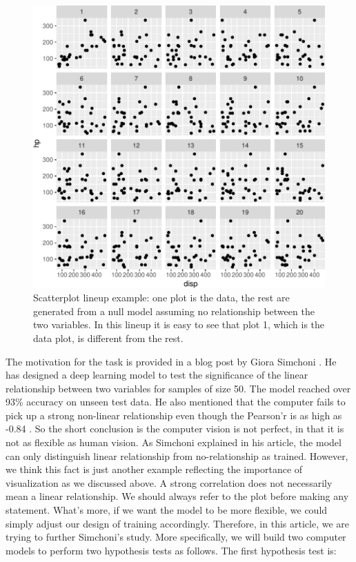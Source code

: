 \documentclass[12pt]{article}
\begin{document}
\begin{figure}
\centering
\includegraphics{pc_plots_files/figure-latex/lineup-1.pdf}
\caption{Scatterplot lineup example: one plot is the data, the rest are
generated from a null model assuming no relationship between the two
variables. In this lineup it is easy to see that plot 1, which is the
data plot, is different from the rest.}
\end{figure}

The motivation for the task is provided in a blog post by Giora Simchoni
\citep{SIM18}. He has designed a deep learning model to test the
significance of the linear relationship between two variables for
samples of size 50. The model reached over 93\% accuracy on unseen test
data. He also mentioned that the computer fails to pick up a strong
non-linear relationship even though the Pearson'r is as high as -0.84
\citep{SIM18}. So the short conclusion is the computer vision is not
perfect, in that it is not as flexible as human vision. As Simchoni
explained in his article, the model can only distinguish linear
relationship from no-relationship as trained. However, we think this
fact is just another example reflecting the importance of visualization
as we discussed above. A strong correlation does not necessarily mean a
linear relationship. We should always refer to the plot before making
any statement. What's more, if we want the model to be more flexible, we
could simply adjust our design of training accordingly. Therefore, in
this article, we are trying to further Simchoni's study. More
specifically, we will build two computer models to perform two
hypothesis tests as follows. The first hypothesis test is:
\end{document}
